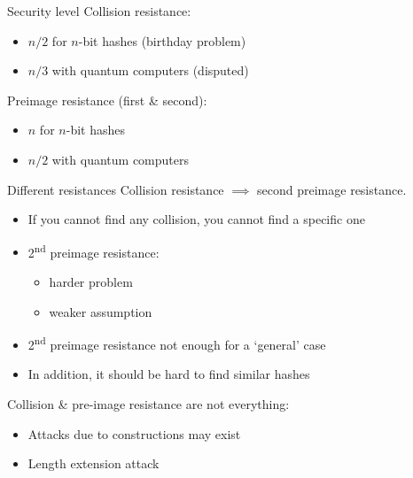 \begin{frame}{Security level}
  Collision resistance:
  \begin{itemize}[<+(1)->]
    \item $n/2$ for $n$-bit hashes (birthday problem)
    \item $n/3$ with quantum computers (disputed)
  \end{itemize}

  \vspace*{1em}

  \pause
  Preimage resistance (first \& second):
  \begin{itemize}[<+(1)->]
    \item $n$ for $n$-bit hashes
    \item $n/2$ with quantum computers
  \end{itemize}
\end{frame}

\begin{frame}{Different resistances}
  Collision resistance $\implies$ second preimage resistance.
  \begin{itemize}[<+(1)->]
    \item If you cannot find any collision, you cannot find a specific one
    \item 2\textsuperscript{nd} preimage resistance:
    \begin{itemize}
      \item harder problem
      \item weaker assumption
    \end{itemize}
    \item 2\textsuperscript{nd} preimage resistance not enough for a `general' case
    \item In addition, it should be hard to find similar hashes
  \end{itemize}

  \vspace*{1em}

  \pause
  Collision \& pre-image resistance are not everything:
  \begin{itemize}[<+(1)->]
    \item Attacks due to constructions may exist
    \item Length extension attack
  \end{itemize}
\end{frame}

